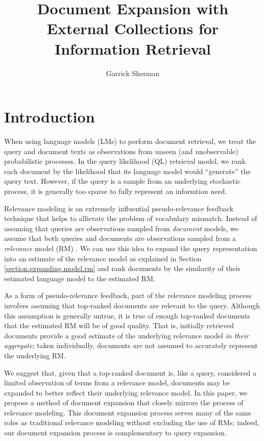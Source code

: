 \documentclass{article}
\begin{document}
\author{Garrick Sherman}

\title{Document Expansion with External Collections for Information Retrieval}

\maketitle
\begin{abstract}
\end{abstract}

\section{Introduction}\label{section.intro}

When using language models (LMs) to perform document retrieval, we treat the query and document texts as observations from unseen (and unobservable) probabilistic processes. In the query likelihood (QL) retrieval model, we rank each document by the likelihood that its language model would ``generate'' the query text. However, if the query is a sample from an underlying stochastic process, it is generally too sparse to fully represent an informtion need.

Relevance modeling is an extremely influential pseudo-relevance feedback technique that helps to allievate the problem of vocabulary mismatch. Instead of assuming that queries are observations sampled from \textit{document} models, we assume that both queries and documents are observations sampled from a \textit{relevance} model (RM) \cite{Lavrenko2001}. We can use this idea to expand the query representation into an estimate of the relevance model as explained in Section \ref{section.expanding.model.rm} and rank documents by the similarity of their estimated language model to the estimated RM.

As a form of pseudo-relevance feedback, part of the relevance modeling process involves assuming that top-ranked documents are relevant to the query. Although this assumption is generally untrue, it is true of enough top-ranked documents that the estimated RM will be of good quality. That is, initially retrieved documents provide a good estimate of the underlying relevance model \textit{in their aggregate}; taken individually, documents are not assumed to accurately represent the underlying RM.

We suggest that, given that a top-ranked document is, like a query, considered a limited observation of terms from a relevance model, documents may be expanded to better reflect their underlying relevance model. In this paper, we propose a method of document expansion that closely mirrors the process of relevance modeling. This document expansion process serves many of the same roles as traditional relevance modeling without excluding the use of RMs; indeed, our document expansion process is complementary to query expansion.
\end{document}
